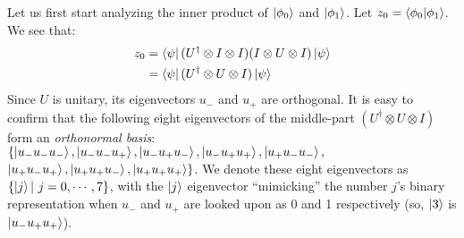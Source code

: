 \begin{prf}
Let us first start analyzing the inner product of $\ket{\phi_0}$ and $\ket{\phi_1}$. 
Let $z_0=\bra{\phi_0}\ket{\phi_1}$. We see that:
\begin{align*}
    z_0 & = \bra{\psi}(U^{\dagger} \otimes I \otimes I) (I \otimes U \otimes I)\ket{\psi} \\
        & = \bra{\psi}(U^{\dagger} \otimes U \otimes I) \ket{\psi}    
\end{align*}
Since $U$ is unitary, its eigenvectors $u_{-}$ and $u_{+}$ are orthogonal.
It is easy to confirm that the following eight eigenvectors of the middle-part $(U^{\dagger} \otimes U \otimes I)$ form an {\em orthonormal basis}: $\{\ket{u_{-}u_{-}u_{-}}, \ket{u_{-}u_{-}u_{+}}, \ket{u_{-}u_{+}u_{-}}, \ket{u_{-}u_{+}u_{+}}, \ket{u_{+}u_{-}u_{-}},$  $\ket{u_{+}u_{-}u_{+}}, \ket{u_{+}u_{+}u_{-}}, \ket{u_{+}u_{+}u_{+}}\}$. 
We denote these eight eigenvectors as $\{ \ket{j}  |\ j=0,\cdots,7\}$, with the $\ket{j}$ eigenvector ``mimicking'' the number $j$'s binary representation when $u_{-}$ and $u_{+}$ are looked upon as 0 and 1 respectively (so, $\ket{3}$ is 
$\ket{u_{-}u_{+}u_{+}}$).


\end{prf}
